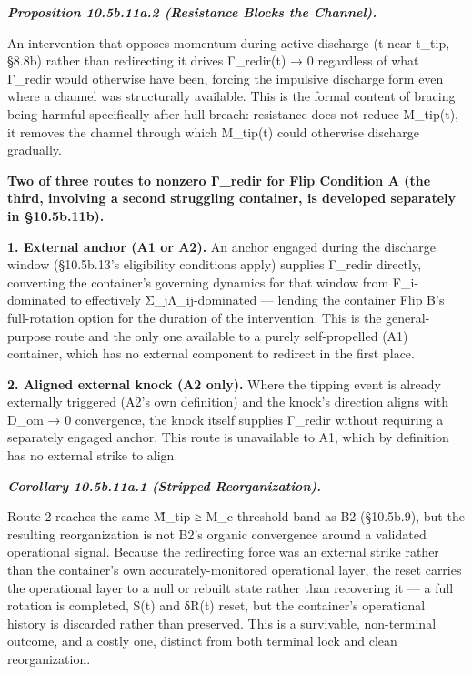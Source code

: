 \documentclass[
]{article}
\begin{document}
\emph{\textbf{Proposition 10.5b.11a.2 (Resistance Blocks the Channel).}}

An intervention that opposes momentum during active discharge (t near
t\_tip, §8.8b) rather than redirecting it drives Γ\_redir(t) → 0
regardless of what Γ\_redir would otherwise have been, forcing the
impulsive discharge form even where a channel was structurally
available. This is the formal content of bracing being harmful
specifically after hull-breach: resistance does not reduce M\_tip(t), it
removes the channel through which M\_tip(t) could otherwise discharge
gradually.

\textbf{Two of three routes to nonzero Γ\_redir for Flip Condition A
(the third, involving a second struggling container, is developed
separately in §10.5b.11b).}

\textbf{1. External anchor (A1 or A2).} An anchor engaged during the
discharge window (§10.5b.13's eligibility conditions apply) supplies
Γ\_redir directly, converting the container's governing dynamics for
that window from F\_i-dominated to effectively Σ\_jΛ\_ij-dominated ---
lending the container Flip B's full-rotation option for the duration of
the intervention. This is the general-purpose route and the only one
available to a purely self-propelled (A1) container, which has no
external component to redirect in the first place.

\textbf{2. Aligned external knock (A2 only).} Where the tipping event is
already externally triggered (A2's own definition) and the knock's
direction aligns with D\_om → 0 convergence, the knock itself supplies
Γ\_redir without requiring a separately engaged anchor. This route is
unavailable to A1, which by definition has no external strike to align.

\emph{\textbf{Corollary 10.5b.11a.1 (Stripped Reorganization).}}

Route 2 reaches the same M̃\_tip ≥ M\_c threshold band as B2 (§10.5b.9),
but the resulting reorganization is not B2's organic convergence around
a validated operational signal. Because the redirecting force was an
external strike rather than the container's own accurately-monitored
operational layer, the reset carries the operational layer to a null or
rebuilt state rather than recovering it --- a full rotation is
completed, S(t) and δR(t) reset, but the container's operational history
is discarded rather than preserved. This is a survivable, non-terminal
outcome, and a costly one, distinct from both terminal lock and clean
reorganization.
\end{document}
